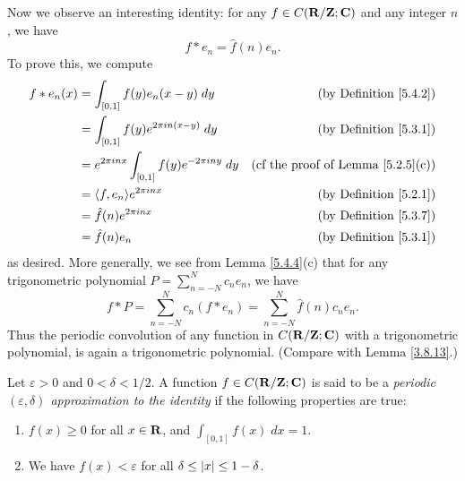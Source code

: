 \begin{additional corollary}\label{ac 5.4.1}
Now we observe an interesting identity:
for any \(f \in C(\mathbf{R} / \mathbf{Z} ; \mathbf{C})\) and any integer \(n\), we have
\[
    f * e_n = \hat{f}(n) e_n.
\]
To prove this, we compute
\begin{align*}
    f * e_n(x) & = \int_{[0, 1]} f(y) e_n(x - y) \; dy                        & \text{(by Definition \ref{5.4.2})}            \\
               & = \int_{[0, 1]} f(y) e^{2 \pi i n (x - y)} \; dy             & \text{(by Definition \ref{5.3.1})}            \\
               & = e^{2 \pi i n x} \int_{[0, 1]} f(y) e^{- 2 \pi i n y} \; dy & \text{(cf the proof of Lemma \ref{5.2.5}(c))} \\
               & = \inner*{f, e_n} e^{2 \pi i n x}                            & \text{(by Definition \ref{5.2.1})}            \\
               & = \hat{f}(n) e^{2 \pi i n x}                                 & \text{(by Definition \ref{5.3.7})}            \\
               & = \hat{f}(n) e_n                                             & \text{(by Definition \ref{5.3.1})}
\end{align*}
as desired.
More generally, we see from Lemma \ref{5.4.4}(c) that for any trigonometric polynomial \(P = \sum_{n = -N}^N c_n e_n\), we have
\[
    f * P = \sum_{n = -N}^N c_n (f * e_n) = \sum_{n = -N}^N \hat{f}(n) c_n e_n.
\]
Thus the periodic convolution of any function in \(C(\mathbf{R} / \mathbf{Z} ; \mathbf{C})\) with a trigonometric polynomial, is again a trigonometric polynomial.
(Compare with Lemma \ref{3.8.13}.)
\end{additional corollary}

\begin{definition}\label{5.4.5}
    Let \(\varepsilon > 0\) and \(0 < \delta < 1 / 2\).
    A function \(f \in C(\mathbf{R} / \mathbf{Z} ; \mathbf{C})\) is said to be a \emph{periodic \((\varepsilon, \delta)\) approximation to the identity} if the following properties are true:
    \begin{enumerate}
        \item \(f(x) \geq 0\) for all \(x \in \mathbf{R}\), and \(\int_{[0, 1]} f(x) \; dx = 1\).
        \item We have \(f(x) < \varepsilon\) for all \(\delta \leq \left\lvert x\right\rvert \leq 1 - \delta\).
    \end{enumerate}
\end{definition}

